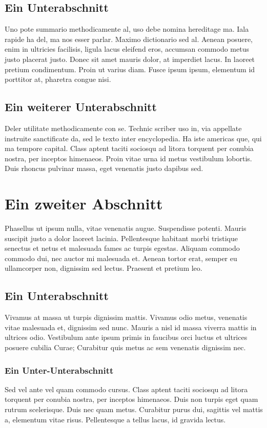 \subsection{Ein Unterabschnitt}
\label{subsec:background:first_section:first_subsection}
Uno pote summario methodicamente al, uso debe nomina hereditage ma. Iala rapide ha del, ma nos esser parlar. Maximo dictionario sed al. Aenean posuere, enim in ultricies facilisis, ligula lacus eleifend eros, accumsan commodo metus justo placerat justo. Donec sit amet mauris dolor, at imperdiet lacus. In laoreet pretium condimentum. Proin ut varius diam. Fusce ipsum ipsum, elementum id porttitor at, pharetra congue nisi.

\subsection{Ein weiterer Unterabschnitt}
\label{subsec:background:first_section:second_subsection}
Deler utilitate methodicamente con se. Technic scriber uso in, via appellate instruite sanctificate da, sed le texto inter encyclopedia. Ha iste americas que, qui ma tempore capital. Class aptent taciti sociosqu ad litora torquent per conubia nostra, per inceptos himenaeos. Proin vitae urna id metus vestibulum lobortis. Duis rhoncus pulvinar massa, eget venenatis justo dapibus sed. 

%
%
\section{Ein zweiter Abschnitt}
\label{sec:background:second_section}
Phasellus ut ipsum nulla, vitae venenatis augue. Suspendisse potenti. Mauris suscipit justo a dolor laoreet lacinia. Pellentesque habitant morbi tristique senectus et netus et malesuada fames ac turpis egestas. Aliquam commodo commodo dui, nec auctor mi malesuada et. Aenean tortor erat, semper eu ullamcorper non, dignissim sed lectus. Praesent et pretium leo. 

\subsection{Ein Unterabschnitt}
\label{subsec:background:second_section:first_subsection}
Vivamus at massa ut turpis dignissim mattis. Vivamus odio metus, venenatis vitae malesuada et, dignissim sed nunc. Mauris a nisl id massa viverra mattis in ultrices odio. Vestibulum ante ipsum primis in faucibus orci luctus et ultrices posuere cubilia Curae; Curabitur quis metus ac sem venenatis dignissim nec.

\subsubsection{Ein Unter-Unterabschnitt}
\label{ssubsec:background:second_section:first_subsection:first_subsubsection}
Sed vel ante vel quam commodo cursus. Class aptent taciti sociosqu ad litora torquent per conubia nostra, per inceptos himenaeos. Duis non turpis eget quam rutrum scelerisque. Duis nec quam metus. Curabitur purus dui, sagittis vel mattis a, elementum vitae risus. Pellentesque a tellus lacus, id gravida lectus.

